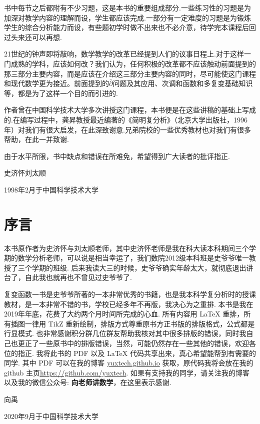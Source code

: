 书中每节之后都附有不少习题，这是本书的重要组成部分.一些练习性的习题是为加深对教学内容的理解而设，学生都应该完成.一部分有一定难度的习题是为锻炼学生的综合分析能力而设，有些题初学时做不出来也不必介意，待学完本课程后回过头来还可以再想.

21世纪的钟声即将敲响，数学教学的改革已经提到人们的议事日程上.对于这样一门成熟的学科，应该如何改？我们认为，任何积极的改革都不应该触动前面提到的那三部分主要内容，而是应该在介绍这三部分主要内容的同时，尽可能使这门课程和现代数学更为接近。前面提到的$\bar\partial$问题及其应用、次调和函数和多复变基础知识等，都是为了这样一个目的而引进的.

作者曾在中国科学技术大学多次讲授这门课程，本书便是在这些讲稿的基础上写成的.在编写过程中，龚昇教授最近编著的《简明复分析》（北京大学出版社，1996年）对我们有很大启发，在此深致谢意.兄弟院校的一些优秀教材也对我们有很多帮助，在此一并致谢.

由于水平所限，书中缺点和错误在所难免，希望得到广大读者的批评指正.

\vspace*{1cm}
\hfill {\kaishu 史济怀\qquad 刘太顺}\hspace*{1.2cm}

\hfill 1998年2月于中国科学技术大学

\newpage
\chapter*{序\qquad 言}
本书原作者为史济怀与刘太顺老师，其中史济怀老师是我在科大读本科期间三个学期的数学分析老师，可以说是相当幸运了，我们数院2012级本科班是史爷爷唯一教授了三个学期的班级. 后来我读大三的时候，史爷爷确实年龄太大，就彻底退出讲台了，自此我也就再也不曾见过史爷爷了.

复变函数一书是史爷爷所著的一本非常优秀的书籍，也是我本科学复分析时的授课教材，是一本非常不错的书，学校已经多年不再版，我决心为之重排. 本书是我在2019年年底，花费了大约两个月时间所完成的心血. 所有内容用 \LaTeX{} 重排，所有插图一律用 TikZ 重新绘制，排版方式尊重原书方正书版的排版格式，公式都是行显模式. 也非常感谢积分群几位群友帮助我核对其中很多排版的错误，同时我自己也更正了一些原书中的排版错误，当然，可能仍然存在一些其他的错误，欢迎各位的指正. 我将此书的 PDF 以及 \LaTeX{} 代码共享出来，真心希望能帮到有需要的同学. 其中 PDF 可以在我的博客 \href{yuxtech.github.io}{yuxtech.github.io} 获取，原代码我将会放在我的 github 主页\href{https://github.com/yuxtech}{https://github.com/yuxtech}. 如果有支持我的同学，请关注我的博客以及我的微信公众号: \textbf{向老师讲数学}，在这里表示感谢.

\hfill {\kaishu 向禹}\hspace*{2.8cm}

\hfill 2020年9月于中国科学技术大学
\clearpage
